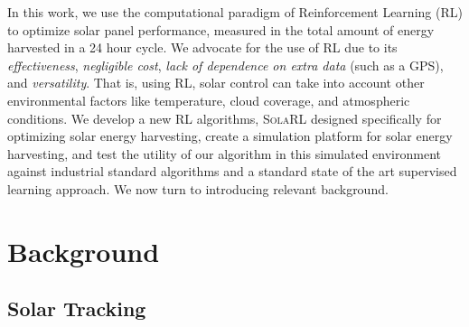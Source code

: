 \documentclass[11pt]{article}
\begin{document}
In this work, we use the computational paradigm of Reinforcement Learning (RL) to optimize solar panel performance, measured in the total amount of energy harvested in a 24 hour cycle. We advocate for the use of RL due to its {\it effectiveness}, {\it negligible cost}, {\it lack of dependence on extra data} (such as a GPS), and {\it versatility}. That is, using RL, solar control can take into account other environmental factors like temperature, cloud coverage, and atmospheric conditions. We develop a new RL algorithms, \textsc{SolaRL} designed specifically for optimizing solar energy harvesting, create a simulation platform for solar energy harvesting, and test the utility of our algorithm in this simulated environment against industrial standard algorithms and a standard state of the art supervised learning approach. We now turn to introducing relevant background.


\section{Background}

\subsection{Solar Tracking}




\end{document}
